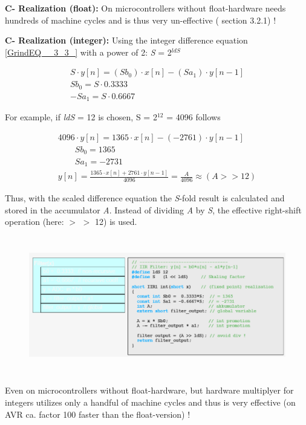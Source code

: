 \textbf{C- Realization (float): } On microcontrollers without float-hardware needs hundreds of machine cycles and is thus very un-effective ( section 3.2.1) !

\textbf{C- Realization (integer): } Using the integer difference equation \eqref{GrindEQ__3_3_} with a power of 2: \textit{S} = 2\textit{${}^{ldS\ }$}

\[\begin{array}{l} {S\cdot y[n]=(Sb_{0} )\cdot x[n]-(Sa_{1} )\cdot y[n-1]} \\ {Sb_{0} =S\cdot 0.3333} \\ {-Sa_{1} =S\cdot 0.6667} \end{array}\] 
 
For example, if \textit{ldS} = 12 is chosen, S = 2${}^{12}$ = 4096 follows

\[\begin{array}{l} {4096\cdot y[n]=1365\cdot x[n]-(-2761)\cdot y[n-1]} \\ {\qquad Sb_{0} =1365} \\ {\qquad Sa_{1} =-2731} \\ {y[n]=\frac{1365\cdot x[n]+2761\cdot y[n-1]}{4096} =\frac{A}{4096} \approx (A>>12)} \end{array}\] 

Thus, with the scaled difference equation the \textit{S}-fold result is calculated and stored in the accumulator \textit{A}. Instead of dividing \textit{A} by \textit{S}, the effective right-shift operation (here: $\mathrm{>}$ $\mathrm{>}$ 12) is used.

	\begin{figure}[h]
    \centering
    \includegraphics[width=14cm, height=6cm]{Images/image147.png}
    \label{fig:Fig }
    \end{figure}

Even on microcontrollers without float-hardware, but hardware multiplyer for integers utilizes only a handful of machine cycles and thus is very effective (on AVR ca. factor 100 faster than the float-version) !

